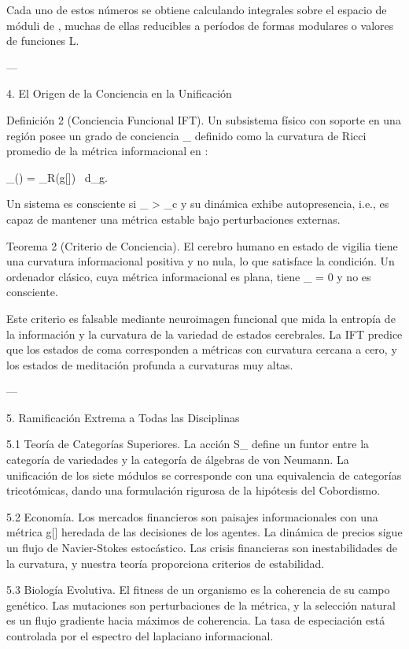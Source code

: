 \documentclass[12pt,twoside]{book}
\begin{document}
Cada uno de estos números se obtiene calculando integrales sobre el espacio de móduli de  \rho , muchas de ellas reducibles a períodos de formas modulares o valores de funciones L.

---

4. El Origen de la Conciencia en la Unificación

Definición 2 (Conciencia Funcional IFT). Un subsistema físico  \Sigma  con soporte en una región  \Omega  posee un grado de conciencia  \Phi_{}  definido como la curvatura de Ricci promedio de la métrica informacional en  \Omega :

\Phi_{}(\Sigma) =  \int_\Omega R(g[\rho]) \, d_g.

Un sistema es consciente si  \Phi_{} > \Phi_c  y su dinámica exhibe autopresencia, i.e., es capaz de mantener una métrica estable bajo perturbaciones externas.

Teorema 2 (Criterio de Conciencia). El cerebro humano en estado de vigilia tiene una curvatura informacional positiva y no nula, lo que satisface la condición. Un ordenador clásico, cuya métrica informacional es plana, tiene  \Phi_{} = 0  y no es consciente.

Este criterio es falsable mediante neuroimagen funcional que mida la entropía de la información y la curvatura de la variedad de estados cerebrales. La IFT predice que los estados de coma corresponden a métricas con curvatura cercana a cero, y los estados de meditación profunda a curvaturas muy altas.

---

5. Ramificación Extrema a Todas las Disciplinas

5.1 Teoría de Categorías Superiores. La acción  S_{}  define un funtor entre la categoría de variedades y la categoría de álgebras de von Neumann. La unificación de los siete módulos se corresponde con una equivalencia de categorías tricotómicas, dando una formulación rigurosa de la hipótesis del Cobordismo.

5.2 Economía. Los mercados financieros son paisajes informacionales con una métrica  g[\rho]  heredada de las decisiones de los agentes. La dinámica de precios sigue un flujo de Navier-Stokes estocástico. Las crisis financieras son inestabilidades de la curvatura, y nuestra teoría proporciona criterios de estabilidad.

5.3 Biología Evolutiva. El fitness de un organismo es la coherencia de su campo  \rho  genético. Las mutaciones son perturbaciones de la métrica, y la selección natural es un flujo gradiente hacia máximos de coherencia. La tasa de especiación está controlada por el espectro del laplaciano informacional.
\end{document}
